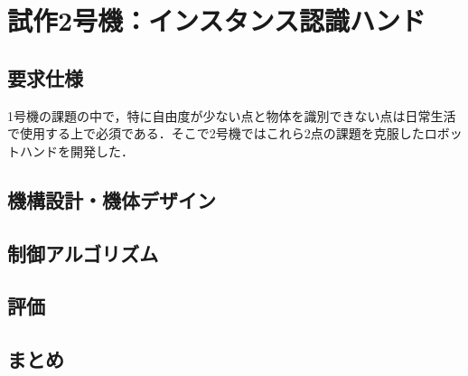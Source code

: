 \chapter{試作2号機：インスタンス認識ハンド}
\newpage

\section{要求仕様}
1号機の課題の中で，特に自由度が少ない点と物体を識別できない点は日常生活で使用する上で必須である．そこで2号機ではこれら2点の課題を克服したロボットハンドを開発した．



\section{機構設計・機体デザイン}



\section{制御アルゴリズム}


\section{評価}


\section{まとめ}




